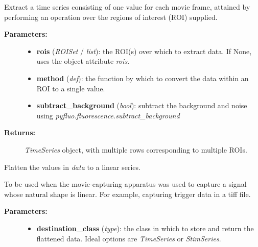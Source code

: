 \documentclass[letterpaper,10pt,english]{sphinxmanual}
\begin{document}
\begin{fulllineitems}
\begin{fulllineitems}
\label{data_structures:movies.Movie.extract_by_roi}
Extract a time series consisting of one value for each movie frame, attained by performing an operation over the regions of interest (ROI) supplied.
\begin{description}
\item[{\textbf{Parameters:}}] \leavevmode\begin{itemize}
\item {} 
\textbf{rois} (\emph{ROISet} / \emph{list}): the ROI(s) over which to extract data. If None, uses the object attribute \emph{rois}.

\item {} 
\textbf{method} (\emph{def}): the function by which to convert the data within an ROI to a single value.

\item {} 
\textbf{subtract\_background} (\emph{bool}): subtract the background and noise using \emph{pyfluo.fluorescence.subtract\_background}

\end{itemize}

\item[{\textbf{Returns:}}] \leavevmode
\emph{TimeSeries} object, with multiple rows corresponding to multiple ROIs.

\end{description}

\end{fulllineitems}


\begin{fulllineitems}
\label{data_structures:movies.Movie.flatten}
Flatten the values in \emph{data} to a linear series.

To be used when the movie-capturing apparatus was used to capture a signal whose natural shape is linear. For example, capturing trigger data in a tiff file.
\begin{description}
\item[{\textbf{Parameters:}}] \leavevmode\begin{itemize}
\item {} 
\textbf{destination\_class} (\emph{type}): the class in which to store and return the flattened data. Ideal options are \emph{TimeSeries} or \emph{StimSeries}.


\end{itemize}
\end{description}
\end{fulllineitems}
\end{fulllineitems}
\end{document}

